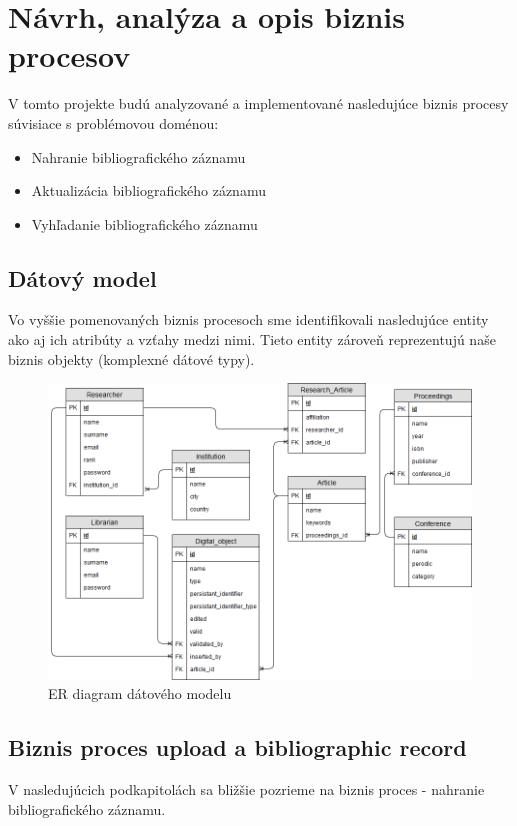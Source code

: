 \documentclass[10pt,oneside,slovak,a4paper]{article}
\begin{document}
\section{Návrh, analýza a opis biznis procesov}

V tomto projekte budú analyzované a implementované nasledujúce biznis procesy súvisiace s problémovou doménou:

\begin{itemize}
\item Nahranie bibliografického záznamu
\item Aktualizácia bibliografického záznamu
\item Vyhľadanie bibliografického záznamu
\end{itemize}

\newpage

\subsection{Dátový model}
Vo vyššie pomenovaných biznis procesoch sme identifikovali nasledujúce entity ako aj ich atribúty a vzťahy medzi nimi. Tieto entity zároveň reprezentujú naše biznis objekty (komplexné dátové typy).

\begin{figure} [H]
\label{datamodel}
\centering
\includegraphics[scale=0.4]{datovy_model.png} 
\caption{ER diagram dátového modelu}
\end{figure}

\subsection{Biznis proces upload a bibliographic record}
V nasledujúcich podkapitolách sa bližšie pozrieme na biznis proces - nahranie bibliografického záznamu.
\end{document}
